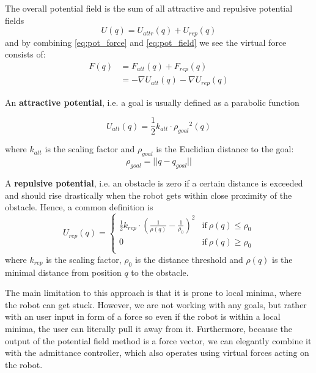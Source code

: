The overall potential field is the sum of all attractive and repulsive potential fields
\begin{equation}
U(q) = U_{attr}(q) + U_{rep}(q)
	\label{eq:pot_field}
\end{equation}
and by combining \ref{eq:pot_force} and \ref{eq:pot_field} we see the virtual force consists of:
\begin{equation}
\begin{aligned}
F(q) &= F_{att}(q) + F_{rep}(q) \\
&= -\nabla U_{att}(q)-\nabla U_{rep}(q)
\end{aligned}
\end{equation}


An \textbf{attractive potential}, i.e. a goal is usually defined as a parabolic function

\begin{equation}
U_{att}(q) = \frac{1}{2} k_{att} \cdot {\rho_{goal}}^2(q)
\end{equation}

where $k_{att}$ is the scaling factor and $\rho_{goal}$ is the Euclidian distance to the goal:
\begin{equation}
\rho_{goal} = ||q-q_{goal}||
\end{equation}


A \textbf{repulsive potential}, i.e. an obstacle is zero if a certain distance is exceeded and should rise drastically when the robot gets within close proximity of the obstacle. Hence, a common definition is
\begin{equation}
U_{rep}(q) = \begin{cases}
      \frac{1}{2} k_{rep}\cdot (\frac{1}{\rho (q)}-\frac{1}{\rho_0})^2 & \text{if}\ \rho (q) \leq \rho_0 \\
      0 & \text{if}\ \rho (q) \geq \rho_0 \\
    \end{cases}
\end{equation}
where $k_{rep}$ is the scaling factor, $\rho_0$ is the distance threshold and $\rho (q)$ is the minimal distance from position $q$ to the obstacle.


The main limitation to this approach is that it is prone to local minima, where the robot can get stuck. However, we are not working with any goals, but rather with an user input in form of a force so even if the robot is within a local minima, the user can literally pull it away from it. Furthermore, because the output of the potential field method is a force vector, we can elegantly combine it with the admittance controller, which also operates using virtual forces acting on the robot. 

